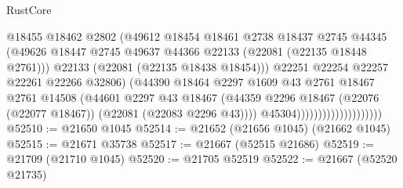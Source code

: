 \begin{lexlean}{RustCore}
\begin{coremodule}
                                            @18455
                                            @18462
                                            @2802
                                            (@49612
                                              @18454
                                              @18461
                                              @2738
                                              @18437
                                              @2745
                                              @44345
                                              (@49626
                                                @18447
                                                @2745
                                                @49637
                                                @44366
                                                @22133
                                                (@22081 (@22135 @18448 @2761)))
                                              @22133
                                              (@22081 (@22135 @18438 @18454)))
                                            @22251
                                            @22254
                                            @22257
                                            @22261
                                            @22266
                                            @32806)
                                          (@44390
                                            @18464
                                            @2297
                                            @1609
                                            @43
                                            @2761
                                            @18467
                                            @2761
                                            @14508
                                            (@44601
                                              @2297
                                              @43
                                              @18467
                                              (@44359
                                                @2296
                                                @18467
                                                (@22076 (@22077 @18467))
                                                (@22081 (@22083 @2296 @43))))
                                            @45304))))))))))))))))))))
@52510 := @21650 @1045
@52514 := @21652 (@21656 @1045) (@21662 @1045)
@52515 := @21671 @35738
@52517 := @21667 (@52515 @21686)
@52519 := @21709 (@21710 @1045)
@52520 := @21705 @52519
@52522 := @21667 (@52520 @21735)

\end{coremodule}
\end{lexlean}
